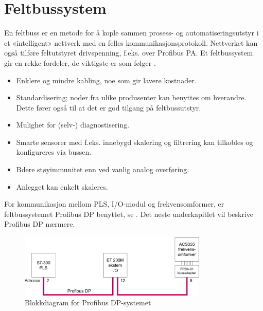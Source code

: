 \documentclass[Visionprosjekt.tex]{subfiles}
\begin{document}
 

\section{Feltbussystem}
\label{sec:feltbuss}





En feltbuss er en metode for å kople sammen prosess- og automatiseringsutstyr i et «intelligent» nettverk med en felles kommunikasjonsprotokoll. Nettverket kan også tilføre feltutstyret drivspenning, f.eks. over Profibus PA.  Et feltbussystem gir en rekke fordeler, de viktigste er som følger \cite{FeltbussMortenPPT,veslemoy}.

\begin{itemize}
    \item Enklere og mindre kabling, noe som gir lavere kostnader.
    \item Standardisering; noder fra ulike produsenter kan benyttes om hverandre. Dette fører også til at det er god tilgang på feltbussutstyr.
    \item Mulighet for (selv-) diagnostisering.
    \item Smarte sensorer med f.eks. innebygd skalering og filtrering kan tilkobles og konfigureres via bussen.
    \item Bdere støyimmunitet enn ved vanlig analog overføring.
    \item Anlegget kan enkelt skaleres.
\end{itemize}






For kommunikasjon mellom PLS, I/O-modul og frekvensomformer, er  feltbussystemet Profibus DP benyttet, se . Det neste underkapitlet vil beskrive Profibus DP nærmere.

\begin{figure}[ht]
	\centering
		\includegraphics[width=0.8\textwidth]{bilder/profiblokk.pdf}
	\caption{Blokkdiagram for Profibus DP-systemet}
	\label{fig:profiblokk}
\end{figure}
\end{document}
